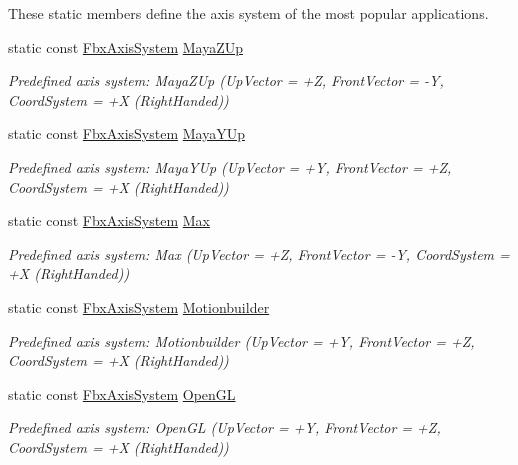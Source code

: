 These static members define the axis system of the most popular applications. \begin{DoxyCompactItemize}
\item 
static const \hyperlink{class_fbx_axis_system}{Fbx\+Axis\+System} \hyperlink{class_fbx_axis_system_af6d2329b82cd505ae9816810f9d26bd6}{Maya\+Z\+Up}
\begin{DoxyCompactList}\small\item\em Predefined axis system\+: Maya\+Z\+Up (Up\+Vector = +Z, Front\+Vector = -\/Y, Coord\+System = +X (Right\+Handed)) \end{DoxyCompactList}\item 
static const \hyperlink{class_fbx_axis_system}{Fbx\+Axis\+System} \hyperlink{class_fbx_axis_system_a898f6952538dbc23cead05b2a1e19d10}{Maya\+Y\+Up}
\begin{DoxyCompactList}\small\item\em Predefined axis system\+: Maya\+Y\+Up (Up\+Vector = +Y, Front\+Vector = +Z, Coord\+System = +X (Right\+Handed)) \end{DoxyCompactList}\item 
static const \hyperlink{class_fbx_axis_system}{Fbx\+Axis\+System} \hyperlink{class_fbx_axis_system_a3ac2db6cd471f8477a1d0b4a3ad22608}{Max}
\begin{DoxyCompactList}\small\item\em Predefined axis system\+: Max (Up\+Vector = +Z, Front\+Vector = -\/Y, Coord\+System = +X (Right\+Handed)) \end{DoxyCompactList}\item 
static const \hyperlink{class_fbx_axis_system}{Fbx\+Axis\+System} \hyperlink{class_fbx_axis_system_af24f958db3b4147d22005984cd4cebb2}{Motionbuilder}
\begin{DoxyCompactList}\small\item\em Predefined axis system\+: Motionbuilder (Up\+Vector = +Y, Front\+Vector = +Z, Coord\+System = +X (Right\+Handed)) \end{DoxyCompactList}\item 
static const \hyperlink{class_fbx_axis_system}{Fbx\+Axis\+System} \hyperlink{class_fbx_axis_system_a30249cc37f848cdac27b77d3520f4e28}{Open\+GL}
\begin{DoxyCompactList}\small\item\em Predefined axis system\+: Open\+GL (Up\+Vector = +Y, Front\+Vector = +Z, Coord\+System = +X (Right\+Handed)) \end{DoxyCompactList}\item 

\end{DoxyCompactItemize}
